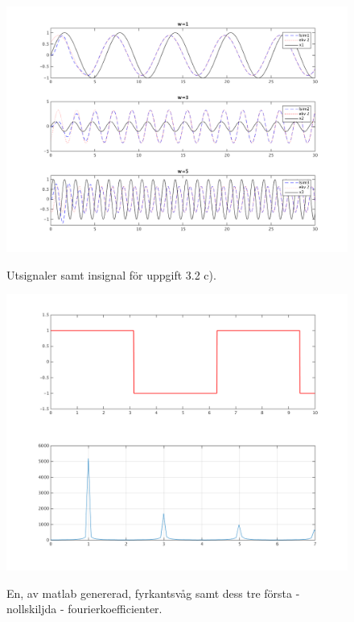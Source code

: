 \begin{figure}
    \caption{Utsignaler samt insignal för uppgift 3.2 c).}
    \centering
    \includegraphics[scale=0.55]{figures/task2c-three-waves.png}
    \label{fig:task2c-three-waves}
\end{figure}

\begin{figure}
    \caption{En, av matlab genererad, fyrkantsvåg samt dess tre första -
        nollskiljda - fourierkoefficienter.}
    \centering
    \includegraphics[scale=0.55]{figures/task3c-square-+-fk.png}
    \label{fig:task3c-square-+-fk}
\end{figure}

